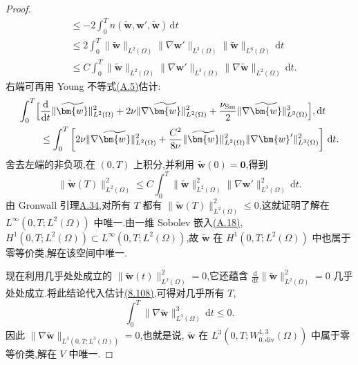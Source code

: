 \begin{theorem}[弱解的唯一性]
\begin{proof}
\begin{equation}
\begin{aligned}
 &\le -2\int_0^T
       n(\widetilde{\bm{w}},\bm{w}',\widetilde{\bm{w}})
                                                    \,\mathrm{d}t\\
 &\le 2\int_0^T
       \|\widetilde{\bm{w}}\|_{L^2(\Omega)}
       \|\nabla\bm{w}'\|_{L^3(\Omega)}
       \|\widetilde{\bm{w}}\|_{L^6(\Omega)}\,\mathrm{d}t\\
 &\le C\int_0^T
       \|\widetilde{\bm{w}}\|_{L^2(\Omega)}
       \|\nabla\bm{w}'\|_{L^3(\Omega)}
       \|\nabla\widetilde{\bm{w}}\|_{L^2(\Omega)}\,\mathrm{d}t.
\end{aligned}
\end{equation}
右端可再用 Young 不等式\hyperref[eq:appendix-a-5]{(A.5)}估计:
\begin{equation}\label{eq:smagorinsky-uniqueness-young-estimate}
\begin{aligned}
 \int_0^T\Bigl[&
 \frac{\mathrm{d}}{\mathrm{d}t}
       \|\widetilde{\bm{w}}\|_{L^2(\Omega)}^2
 +2\nu\|\nabla\widetilde{\bm{w}}\|_{L^2(\Omega)}^2
 +\frac{\nu_{\mathrm{Sm}}}{2}
       \|\nabla\widetilde{\bm{w}}\|_{L^3(\Omega)}^3\Bigr],\mathrm{d}t\\
 &\le\int_0^T\left[
       2\nu\|\nabla\widetilde{\bm{w}}\|_{L^2(\Omega)}^2
       +\frac{C^2}{8\nu}
          \|\widetilde{\bm{w}}\|_{L^2(\Omega)}^2
          \|\nabla\bm{w}'\|_{L^3(\Omega)}^2
                       \right]\,\mathrm{d}t.
\end{aligned}
\end{equation}
舍去左端的非负项,在 $(0,T)$ 上积分,并利用 $\widetilde{\bm{w}}(0)=\bm{0}$,得到
\begin{equation}\label{eq:smagorinsky-uniqueness-gronwall-estimate}
 \|\widetilde{\bm{w}}(T)\|_{L^2(\Omega)}^2
 \le C\int_0^T
       \|\widetilde{\bm{w}}\|_{L^2(\Omega)}^2
       \|\nabla\bm{w}'\|_{L^3(\Omega)}^2\,\mathrm{d}t.
\end{equation}
由 Gronwall 引理\hyperref[thm:appendix-a-34]{A.34},对所有 $T$ 都有
$\|\widetilde{\bm{w}}(T)\|_{L^2(\Omega)}^2\le0$,这就证明了解在
$L^\infty(0,T;L^2(\Omega))$ 中唯一.由一维 Sobolev 嵌入\hyperref[eq:appendix-a-18]{(A.18)},
$H^1(0,T;L^2(\Omega))\subset L^\infty(0,T;L^2(\Omega))$,故
$\widetilde{\bm{w}}$ 在 $H^1(0,T;L^2(\Omega))$ 中也属于零等价类,解在该空间中唯一.

现在利用几乎处处成立的 $\|\widetilde{\bm{w}}(t)\|_{L^2(\Omega)}^2=0$,它还蕴含
$\frac{\mathrm{d}}{\mathrm{d}t}\|\widetilde{\bm{w}}\|_{L^2(\Omega)}^2=0$ 几乎处处成立.将此结论代入估计\hyperref[eq:smagorinsky-uniqueness-young-estimate]{(8.108)},可得对几乎所有 $T$,
\[
 \int_0^T\|\nabla\widetilde{\bm{w}}\|_{L^3(\Omega)}^3\,\mathrm{d}t\le0.
\]
因此 $\|\nabla\widetilde{\bm{w}}\|_{L^3(0,T;L^3(\Omega))}=0$,也就是说,
$\widetilde{\bm{w}}$ 在 $L^3(0,T;W_{0,\mathrm{div}}^{1,3}(\Omega))$ 中属于零等价类,解在 $V$ 中唯一.
\end{proof}
\end{theorem}

